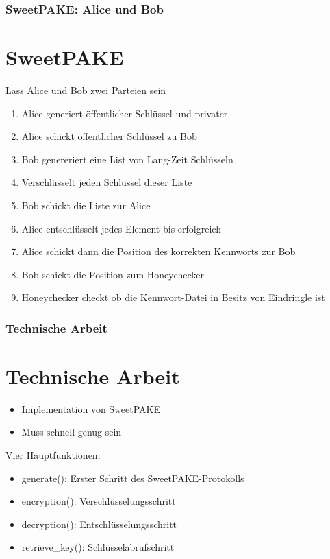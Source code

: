 \documentclass[9pt]{beamer}
\begin{document}
\begin{frame}
\frametitle{SweetPAKE: Alice und Bob}
\section{SweetPAKE}
Lass Alice und Bob zwei Parteien sein
\begin{enumerate}
	\item Alice generiert öffentlicher Schlüssel und privater
	\item Alice schickt öffentlicher Schlüssel zu Bob
	\item Bob genereriert eine List von Lang-Zeit Schlüsseln
	\item Verschlüsselt jeden Schlüssel dieser Liste
	\item Bob schickt die Liste zur Alice
	\item Alice entschlüsselt jedes Element bis erfolgreich
	\item Alice schickt dann die Position des korrekten Kennworts zur Bob
	\item Bob schickt die Position zum Honeychecker
	\item Honeychecker checkt ob die Kennwort-Datei in Besitz von Eindringle ist
\end{enumerate}
\end{frame}

\begin{frame}
\frametitle{Technische Arbeit}
\section{Technische Arbeit}
	\begin{itemize}
		\item Implementation von SweetPAKE
		\item Muss schnell genug sein
	\end{itemize}
	Vier Hauptfunktionen:
	\begin{itemize}
		\item generate(): Erster Schritt des SweetPAKE-Protokolls
		\item encryption(): Verschlüsselungsschritt
		\item decryption(): Entschlüsselungsschritt
		\item retrieve\_key(): Schlüsselabrufschritt
	\end{itemize}
\end{frame}
\end{document}
